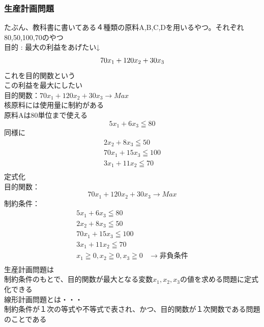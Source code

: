 \documentclass{jsarticle}
\begin{document}
			\subsubsection{生産計画問題}
				たぶん、教科書に書いてある４種類の原料A,B,C,Dを用いるやつ。それぞれ80,50,100,70のやつ\\
				目的 : 最大の利益をあげたい↓\\
				\[
					70x_1+120x_2+30x_3\\
				\]
				これを{\large{目的関数}}という\\
				この利益を最大にしたい\\
				目的関数：$70x_1+120x_2+30x_3→Max$\\
				核原料には使用量に制約がある\\
				原料Aは80単位まで使える\\
				\[
					5x_1    +6x_3≦80
				\]
				同様に
				\begin{eqnarray}
					      2x_2+8x_3≦50\\
					70x_1     +15x_3≦100\\
					3x_1+11x_2     ≦70\\
				\end{eqnarray}
				定式化\\
				目的関数：\[70x_1+120x_2+30x_3→Max\]
				制約条件：\\
				\begin{eqnarray}
					5x_1    +6x_3≦80\\
					      2x_2+8x_3≦50\\
					70x_1     +15x_3≦100\\
					3x_1+11x_2     ≦70\\
					x_1≧0,x_2≧0,x_3≧0 &→ 非負条件\\
				\end{eqnarray}
				生産計画問題は\\
				制約条件のもとで、目的関数が最大となる変数$x_1,x_2,x_3$の値を求める問題に定式化できる\\
				{\Large{線形計画問題とは・・・}}\\
				制約条件が１次の等式や不等式で表され、かつ、目的関数が１次関数である問題のことである\\
\end{document}
